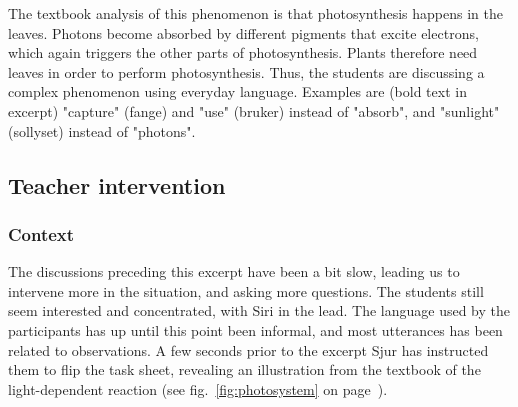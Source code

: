  The textbook analysis of this phenomenon is that photosynthesis happens in the leaves. Photons become absorbed by different pigments that excite electrons, which again triggers the other parts of photosynthesis. Plants therefore need leaves in order to perform photosynthesis. Thus, the students are discussing a complex phenomenon using everyday language. Examples are (bold text in excerpt) "capture" (fange) and "use" (bruker) instead of "absorb", and "sunlight" (sollyset) instead of "photons". 

\subsection{Teacher intervention}

\subsubsection*{Context}
The discussions preceding this excerpt have been a bit slow, leading us to intervene more in the situation, and asking more questions. The students still seem interested and concentrated, with Siri in the lead. The language used by the participants has up until this point been informal, and most utterances has been related to observations. A few seconds prior to the excerpt Sjur has instructed them to flip the task sheet, revealing an illustration from the textbook of the light-dependent reaction (see fig.~\ref{fig:photosystem} on page~\pageref{fig:photosystem}).

